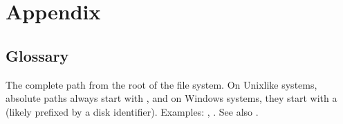 \chapter{Appendix}
\label{\detokenize{book_appendix:appendix}}\label{\detokenize{book_appendix::doc}}
\begin{figure}[tbp]
\centering

\noindent{}
\end{figure}

\sphinxstepscope


\section{Glossary}
\label{\detokenize{glossary:glossary}}\label{\detokenize{glossary:id1}}\label{\detokenize{glossary::doc}}\begin{description}
\ignorespaces 
\sphinxAtStartPar
The complete path from the root of the file system. On Unix\sphinxhyphen{}like systems, absolute paths always start with \sphinxcode{\sphinxupquote{/}}, and on Windows systems, they start with a \sphinxcode{\sphinxupquote{\textbackslash{}}} (likely prefixed by a disk identifier).
Examples: , . See also {\hyperref[\detokenize{glossary:term-relative-path}]{}}.


\end{description}
